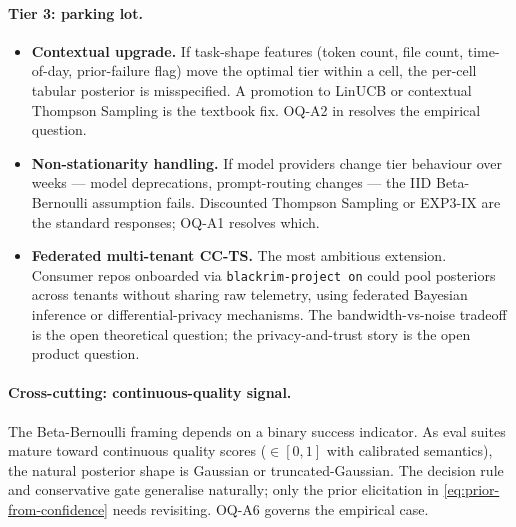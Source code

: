 \paragraph{Tier 3: parking lot.}
\begin{itemize}[leftmargin=*]
  \item \textbf{Contextual upgrade.} If task-shape features (token count,
        file count, time-of-day, prior-failure flag) move the optimal tier
        within a cell, the per-cell tabular posterior is misspecified. A
        promotion to LinUCB \cite{li2010contextual} or contextual
        Thompson Sampling \cite{agrawal2013thompson} is the textbook fix.
        OQ-A2 in \cite{blackrim_moa1c} resolves the empirical question.
  \item \textbf{Non-stationarity handling.} If model providers change tier
        behaviour over weeks --- model deprecations, prompt-routing
        changes --- the IID Beta-Bernoulli assumption fails. Discounted
        Thompson Sampling \cite{rajcoomar2017discounted} or EXP3-IX
        \cite{neu2015explore} are the standard responses; OQ-A1 resolves
        which.
  \item \textbf{Federated multi-tenant CC-TS.} The most ambitious
        extension. Consumer repos onboarded via \texttt{blackrim-project on}
        could pool posteriors across tenants without sharing raw
        telemetry, using federated Bayesian inference
        \cite{shi2024federated} or differential-privacy mechanisms. The
        bandwidth-vs-noise tradeoff is the open theoretical question; the
        privacy-and-trust story is the open product question.
\end{itemize}

\paragraph{Cross-cutting: continuous-quality signal.}
The Beta-Bernoulli framing depends on a binary success indicator. As eval
suites mature toward continuous quality scores ($\in [0,1]$ with
calibrated semantics), the natural posterior shape is Gaussian or
truncated-Gaussian. The decision rule and conservative gate generalise
naturally; only the prior elicitation in \cref{eq:prior-from-confidence}
needs revisiting. OQ-A6 governs the empirical case.
